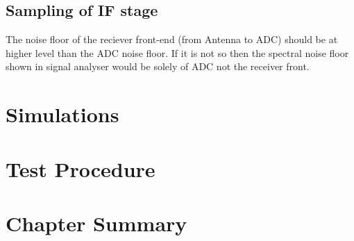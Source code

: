 	\subsection{Sampling of IF stage}
	The noise floor of the reciever front-end (from Antenna to ADC) should be at higher level than the ADC noise floor. If it is not so then the spectral noise floor shown in signal analyser would be solely of ADC not the receiver front. 
\section{Simulations}
\section{Test Procedure}
\section{Chapter Summary}
